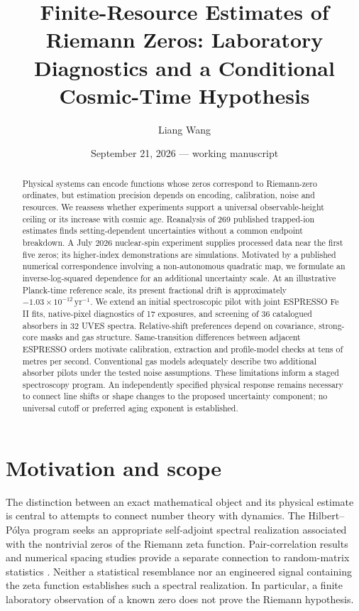 \documentclass[aps,pra,onecolumn,amsmath,amssymb,nofootinbib,superscriptaddress,floatfix,11pt]{revtex4-2}
\begin{document}
\title{Finite-Resource Estimates of Riemann Zeros: Laboratory Diagnostics and a Conditional Cosmic-Time Hypothesis}
\author{Liang Wang}
\noaffiliation
\date{September 21, 2026 --- working manuscript}
\begin{abstract}
Physical systems can encode functions whose zeros correspond to Riemann-zero ordinates, but estimation precision depends on encoding, calibration, noise and resources. We reassess whether experiments support a universal observable-height ceiling or its increase with cosmic age. Reanalysis of 269 published trapped-ion estimates finds setting-dependent uncertainties without a common endpoint breakdown. A July 2026 nuclear-spin experiment supplies processed data near the first five zeros; its higher-index demonstrations are simulations. Motivated by a published numerical correspondence involving a non-autonomous quadratic map, we formulate an inverse-log-squared dependence for an additional uncertainty scale. At an illustrative Planck-time reference scale, its present fractional drift is approximately $-1.03\times10^{-12}\,\mathrm{yr}^{-1}$. We extend an initial spectroscopic pilot with joint ESPRESSO Fe II fits, native-pixel diagnostics of 17 exposures, and screening of 36 catalogued absorbers in 32 UVES spectra. Relative-shift preferences depend on covariance, strong-core masks and gas structure. Same-transition differences between adjacent ESPRESSO orders motivate calibration, extraction and profile-model checks at tens of metres per second. Conventional gas models adequately describe two additional absorber pilots under the tested noise assumptions. These limitations inform a staged spectroscopy program. An independently specified physical response remains necessary to connect line shifts or shape changes to the proposed uncertainty component; no universal cutoff or preferred aging exponent is established.
\end{abstract}
\maketitle

\section{Motivation and scope}
The distinction between an exact mathematical object and its physical estimate is central to attempts to connect number theory with dynamics. The Hilbert--P\'olya program seeks an appropriate self-adjoint spectral realization associated with the nontrivial zeros of the Riemann zeta function. Pair-correlation results and numerical spacing studies provide a separate connection to random-matrix statistics \cite{Montgomery1973,Odlyzko1987,BerryKeating1999}. Neither a statistical resemblance nor an engineered signal containing the zeta function establishes such a spectral realization. In particular, a finite laboratory observation of a known zero does not prove the Riemann hypothesis.
\end{document}
